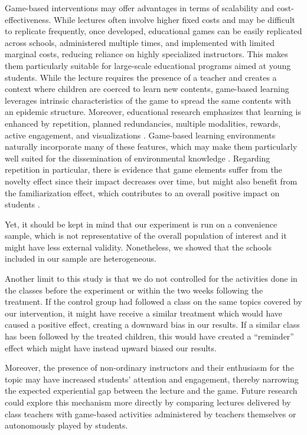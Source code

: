 \documentclass[preprint,12pt]{elsarticle}
\begin{document}
Game-based interventions may offer advantages in terms of scalability and cost-effectiveness. While lectures often involve higher fixed costs and may be difficult to replicate frequently, once developed, educational games can be easily replicated across schools, administered multiple times, and implemented with limited marginal costs, reducing reliance on highly specialized instructors. This makes them particularly suitable for large-scale educational programs aimed at young students. While the lecture requires the presence of a teacher and creates a context where children are coerced to learn new contents, game-based learning leverages intrinsic characteristics of the game to spread the same contents with an epidemic structure. Moreover, educational research emphasizes that learning is enhanced by repetition, planned redundancies, multiple modalities, rewards, active engagement, and visualizations \cite{friedlander2011can}. Game-based learning environments naturally incorporate many of these features, which may make them particularly well suited for the dissemination of environmental knowledge \cite{janakiraman2018using}. Regarding repetition in particular, there is evidence that game elements suffer from the novelty effect since their impact decreases over time, but might also benefit from the familiarization effect, which contributes to an overall positive impact on students \cite{rodrigues2022gamification, tsay2020overcoming}.


Yet, it should be kept in mind that our experiment is run on a convenience sample, which is not representative of the overall population of interest and it might have less external validity. Nonetheless, we showed that the schools included in our sample are heterogeneous.

Another limit to this study is that we do not controlled for the activities done in the classes before the experiment or within the two weeks following the treatment. If the control group had followed a class on the same topics covered by our intervention, it might have receive a similar treatment which would have caused a positive effect, creating a downward bias in our results. If a similar class has been followed by the treated children, this would have created a \enquote{reminder} effect which might have instead upward biased our results.

Moreover, the presence of non-ordinary instructors and their enthusiasm for the topic may have increased students’ attention and engagement, thereby narrowing the expected experiential gap between the lecture and the game. Future research could explore this mechanism more directly by comparing lectures delivered by class teachers with game-based activities administered by teachers themselves or autonomously played by students.
\end{document}
